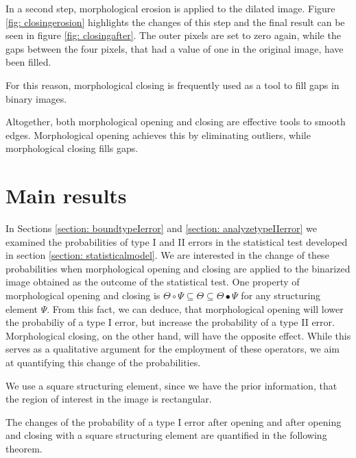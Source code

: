 \documentclass[a4paper,12pt]{article}
\theoremstyle{plain}
\theoremstyle{definition}
\begin{document}
In a second step, morphological erosion is applied to the dilated image. Figure \ref{fig: closingerosion} highlights the changes of this step and the final result can be seen in figure \ref{fig: closingafter}. The outer pixels are set to zero again, while the gaps between the four pixels, that had a value of one in the original image, have been filled.

For this reason, morphological closing is frequently used as a tool to fill gaps in binary images.


Altogether, both morphological opening and closing are effective tools to smooth edges. Morphological opening achieves this by eliminating outliers, while morphological closing fills gaps.

\newpage

\section{Main results}\label{section: mainresults}

In Sections \ref{section: boundtypeIerror} and \ref{section: analyzetypeIIerror} we examined the probabilities of type I and II errors in the statistical test developed in section \ref{section: statisticalmodel}. We are interested in the change of these probabilities when morphological opening and closing are applied to the binarized image obtained as the outcome of the statistical test. One property of morphological opening and closing is $\Theta \circ \Psi \subseteq \Theta \subseteq \Theta \bullet \Psi$ for any structuring element $\Psi$. From this fact, we can deduce, that morphological opening will lower the probabiliy of a type I error, but increase the probability of a type II error. Morphological closing, on the other hand, will have the opposite effect. While this serves as a qualitative argument for the employment of these operators, we aim at quantifying this change of the probabilities. 

We use a square structuring element, since we have the prior information, that the region of interest in the image is rectangular.

The changes of the probability of a type I error after opening and after opening and closing with a square structuring element are quantified in the following theorem.
\end{document}
